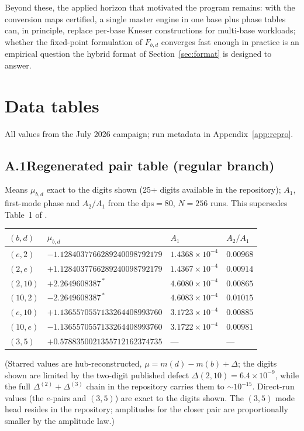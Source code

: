 \documentclass[11pt,a4paper]{article}
\theoremstyle{definition}
\theoremstyle{remark}
\begin{document}
Beyond these, the applied horizon that motivated the program remains: with the conversion
maps certified, a single master engine in one base plus phase tables can, in principle,
replace per-base Kneser constructions for multi-base workloads; whether the fixed-point
formulation of $F_{b,d}$ converges fast enough in practice is an empirical question the
hybrid format of Section~\ref{sec:format} is designed to answer.

\appendix

\section{Data tables}\label{app:tables}

All values from the July 2026 campaign; run metadata in Appendix~\ref{app:repro}.

\subsection*{A.1\quad Regenerated pair table (regular branch)}

Means $\mu_{b,d}$ exact to the digits shown (25+ digits available in the repository);
$A_1$, first-mode phase and $A_2/A_1$ from the $\mathrm{dps}=80$, $N=256$ runs. This
supersedes Table~1 of \cite{phaselaw}.

\begin{center}
\begin{tabular}{llll}
\toprule
$(b,d)$ & $\mu_{b,d}$ & $A_1$ & $A_2/A_1$ \\
\midrule
$(e,2)$ & $-1.1284037766289240098792179$ & $1.4368\times10^{-4}$ & $0.00968$ \\
$(2,e)$ & $+1.1284037766289240098792179$ & $1.4367\times10^{-4}$ & $0.00914$ \\
$(2,10)$ & $+2.2649608387^{\,*}$ & $4.6080\times10^{-4}$ & $0.00865$ \\
$(10,2)$ & $-2.2649608387^{\,*}$ & $4.6083\times10^{-4}$ & $0.01015$ \\
$(e,10)$ & $+1.1365570557133264408993760$ & $3.1723\times10^{-4}$ & $0.00885$ \\
$(10,e)$ & $-1.1365570557133264408993760$ & $3.1722\times10^{-4}$ & $0.00981$ \\
$(3,5)$ & $+0.5788350021355712162374735$ & --- & --- \\
\bottomrule
\end{tabular}
\end{center}

\noindent(Starred values are hub-reconstructed, $\mu=m(d)-m(b)+\Delta$; the digits shown are
limited by the two-digit published defect $\Delta(2,10)=6.4\times10^{-9}$, while the full
$\Delta^{(2)}+\Delta^{(3)}$ chain in the repository carries them to $\sim10^{-15}$. Direct-run
values (the $e$-pairs and $(3,5)$) are exact to the digits shown. The $(3,5)$ mode head
resides in the repository; amplitudes for the closer pair are proportionally smaller by the
amplitude law.)
\end{document}
